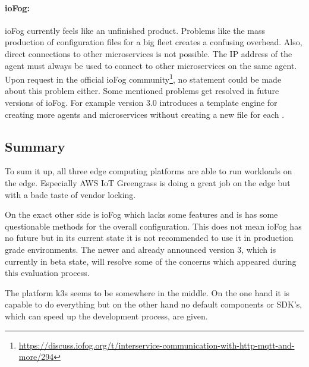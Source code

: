 \paragraph{ioFog:} ioFog currently feels like an unfinished product. Problems like the mass production of configuration files for a big fleet creates a confusing overhead. Also, direct connections to other microservices is not possible. The IP address of the agent must always be used to connect to other microservices on the same agent. Upon request in the official ioFog community\footnote{\url{https://discuss.iofog.org/t/interservice-communication-with-http-mqtt-and-more/294}}, no statement could be made about this problem either. Some mentioned problems get resolved in future versions of ioFog. For example version 3.0 introduces a template engine for creating more agents and microservices without creating a new file for each \cite{ioFogTemplateEngine}.

\subsection*{Summary}
To sum it up, all three edge computing platforms are able to run workloads on the edge. Especially AWS IoT Greengrass is doing a great job on the edge but with a bade taste of vendor locking. 

On the exact other side is ioFog which lacks some features and is has some questionable methods for the overall configuration. This does not mean ioFog has no future but in its current state it is not recommended to use it in production grade environments. The newer and already announced version 3, which is currently in beta state, will resolve some of the concerns which appeared during this evaluation process. 

The platform k3s seems to be somewhere in the middle. On the one hand it is capable to do everything but on the other hand no default components or SDK's, which can speed up the development process, are given.
    


